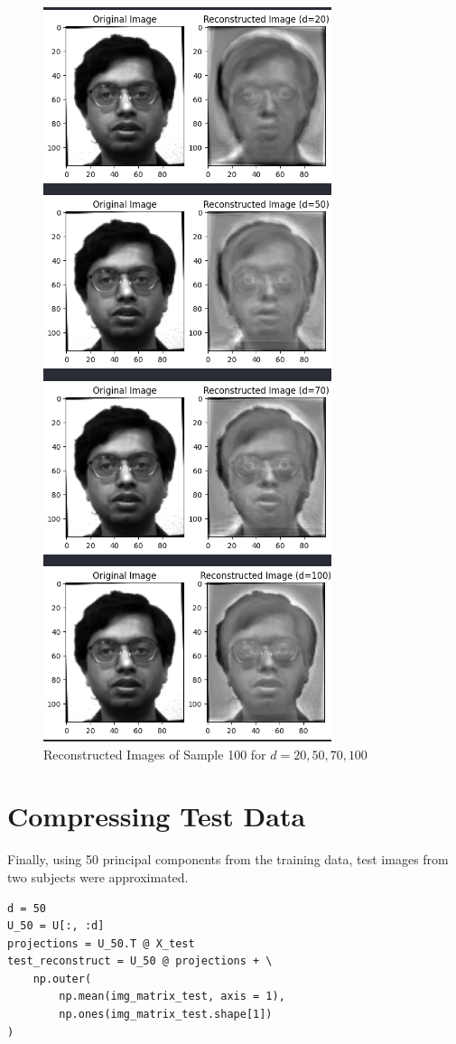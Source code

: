 \documentclass[conference]{IEEEtran}
\begin{document}
\begin{figure}[htbp]
  \centerline{\includegraphics[scale=0.4]{figures/reconstructed_images.png}}
  \caption{Reconstructed Images of Sample 100 for $d=20,50,70,100$}
  \label{fig:reconstructed_images}
\end{figure}  

\section{Compressing Test Data}
Finally, using 50 principal components from the training data, test images from two subjects were approximated.
\begin{verbatim}
d = 50
U_50 = U[:, :d]
projections = U_50.T @ X_test
test_reconstruct = U_50 @ projections + \
    np.outer(
        np.mean(img_matrix_test, axis = 1),
        np.ones(img_matrix_test.shape[1])
)
\end{verbatim}
\end{document}

